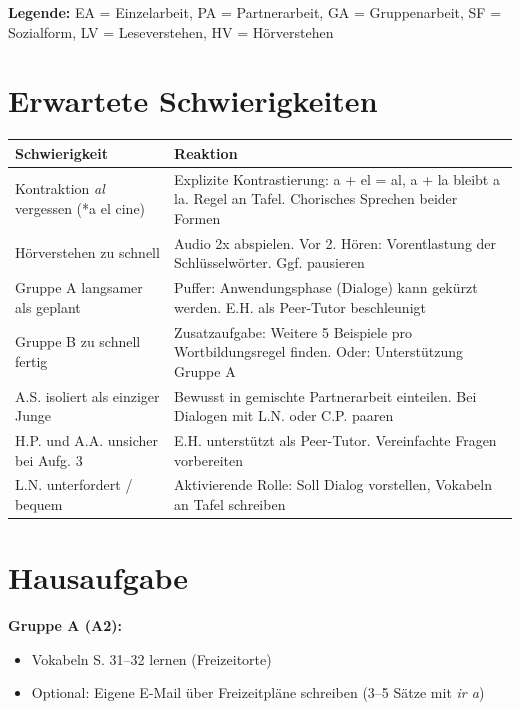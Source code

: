 \documentclass[11pt,a4paper]{article}
\begin{document}
\textbf{Legende:} EA = Einzelarbeit, PA = Partnerarbeit, GA = Gruppenarbeit, SF = Sozialform, LV = Leseverstehen, HV = Hörverstehen

\section{Erwartete Schwierigkeiten}

\begin{tabular}{|p{5cm}|p{8cm}|}
\hline
\textbf{Schwierigkeit} & \textbf{Reaktion} \\
\hline
Kontraktion \textit{al} vergessen (*a el cine) & Explizite Kontrastierung: a + el = al, a + la bleibt a la. Regel an Tafel. Chorisches Sprechen beider Formen \\
\hline
Hörverstehen zu schnell & Audio 2x abspielen. Vor 2. Hören: Vorentlastung der Schlüsselwörter. Ggf. pausieren \\
\hline
Gruppe A langsamer als geplant & Puffer: Anwendungsphase (Dialoge) kann gekürzt werden. E.H. als Peer-Tutor beschleunigt \\
\hline
Gruppe B zu schnell fertig & Zusatzaufgabe: Weitere 5 Beispiele pro Wortbildungsregel finden. Oder: Unterstützung Gruppe A \\
\hline
A.S. isoliert als einziger Junge & Bewusst in gemischte Partnerarbeit einteilen. Bei Dialogen mit L.N. oder C.P. paaren \\
\hline
H.P. und A.A. unsicher bei Aufg. 3 & E.H. unterstützt als Peer-Tutor. Vereinfachte Fragen vorbereiten \\
\hline
L.N. unterfordert / bequem & Aktivierende Rolle: Soll Dialog vorstellen, Vokabeln an Tafel schreiben \\
\hline
\end{tabular}

\section{Hausaufgabe}

\textbf{Gruppe A (A2):}
\begin{itemize}
    \item Vokabeln S. 31--32 lernen (Freizeitorte)
    \item Optional: Eigene E-Mail über Freizeitpläne schreiben (3--5 Sätze mit \textit{ir a})
\end{itemize}
\end{document}
